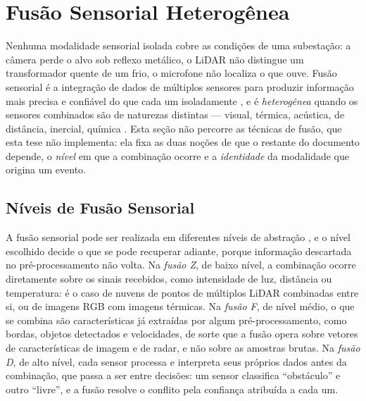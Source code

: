 \section{Fusão Sensorial Heterogênea}
\label{sec:fund-fusao}

Nenhuma modalidade sensorial isolada cobre as condições de uma subestação: a câmera
perde o alvo sob reflexo metálico, o \ac{LiDAR} não distingue um transformador quente de
um frio, o microfone não localiza o que ouve. Fusão sensorial é a integração de dados de
múltiplos sensores para produzir informação mais precisa e confiável do que cada um
isoladamente \cite{Hall1997}, e é \emph{heterogênea} quando os sensores combinados são de
naturezas distintas --- visual, térmica, acústica, de distância, inercial, química
\cite{Alatise2020Review}. Esta seção não percorre as técnicas de fusão, que esta tese não
implementa: ela fixa as duas noções de que o restante do documento depende, o
\emph{nível} em que a combinação ocorre e a \emph{identidade} da modalidade que origina
um evento.

\subsection{Níveis de Fusão Sensorial}
A fusão sensorial pode ser realizada em diferentes níveis de abstração
\cite{Costa2018ImplementacaoFusao, Santos2023FusaoSensorial}, e o nível escolhido decide
o que se pode recuperar adiante, porque informação descartada no pré-processamento não
volta. Na \emph{fusão Z}, de baixo nível, a combinação ocorre diretamente sobre os sinais
recebidos, como intensidade de luz, distância ou temperatura: é o caso de nuvens de
pontos de múltiplos \ac{LiDAR} combinadas entre si, ou de imagens \ac{RGB} com imagens
térmicas. Na \emph{fusão F}, de nível médio, o que se combina são características já
extraídas por algum pré-processamento, como bordas, objetos detectados e velocidades, de
sorte que a fusão opera sobre vetores de características de imagem e de radar, e não
sobre as amostras brutas. Na \emph{fusão D}, de alto nível, cada sensor processa e
interpreta seus próprios dados antes da combinação, que passa a ser entre decisões: um
sensor classifica ``obstáculo'' e outro ``livre'', e a fusão resolve o conflito pela
confiança atribuída a cada um.

